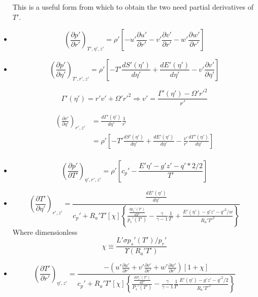 \documentclass[preprint, prX]{revtex4}
\newcommand{\gogmo}{\frac{\gamma}{\gamma-1}}
\newcommand{\dd}[2]{\frac{d#1}{d#2}}
\newcommand{\pd}[2]{\frac{\partial#1}{\partial#2}}
\newcommand{\tpd}[3]{\left( \frac{\partial#1}{\partial#2} \right)_{#3}}
\begin{document}
\begin{itemize}
This is a useful form from which to obtain the two need partial derivatives of $T'$.

\item 
\begin{equation}
\tpd{p'}{r'}{T', \eta', z'} = \rho' \left[ -u' \pd{u'}{r'} - v'\pd{v'}{r'} - w'\pd{w'}{r'} \right]
\end{equation}

\item
\begin{equation}
\tpd{p'}{\eta'}{T', r', z'} = \rho' \left[ -T' \dd{S'(\eta')}{\eta'} + \dd{E'(\eta')}{\eta'} - v' \pd{v'}{\eta'} \right]
\end{equation}

\begin{equation}
\Gamma'(\eta') = r'v' + \Omega'r'^2 \Rightarrow v' = \frac{\Gamma'(\eta') - \Omega'r'^2}{r'}
\end{equation}

\begin{equation}
\begin{split}
\tpd{v'}{\eta'}{r',z'} &= \dd{\Gamma'(\eta')}{\eta'}\frac{1}{r'} \\
& = \rho' \left[ -T' \dd{S'(\eta')}{\eta'} + \dd{E'(\eta')}{\eta'} - \frac{v'}{r'} \dd{\Gamma'(\eta')}{\eta'} \right] \\
\end{split}
\end{equation}

\item
\begin{equation}
\tpd{p'}{T'}{\eta', r', z'} = \rho' \left[ c_p'- \frac{E'{\eta'} -g'z' - q'*2/2}{T'} \right]
\end{equation}

\item
\begin{equation}
\tpd{T'}{\eta'}{r',z'} = \frac{\dd{E'(\eta')}{\eta'	}}{c_p' + R_a'T'[\chi]\left\{ \frac{\dd{p_s'(T')}{T'}}{p_s'(T')} - \gogmo \frac{1}{T'} + \frac{E'(\eta') - g'z'-q'^2/w}{R_a'T'^2}\right\} }
\end{equation}
Where dimensionless 
\begin{equation}
\chi \equiv \frac{L'\sigma p_s'(T')/p_r'}{\Upsilon(R_a' T')} 
\end{equation}

\item
\begin{equation}
\tpd{T'}{r'}{\eta',z'} = \frac{-\left( u'\pd{u'}{r'} + v' \pd{v'}{r'} + w'\pd{w'}{r'}\right)\left[ 1 + \chi\right]}{c_p' + R_a'T'[\chi] \left\{ \frac{\dd{P_s'(T')}{T'}}{P_s'(T')} - \gogmo \frac{1}{T'} \frac{E'(\eta') - g'z'-q'^2/2}{R_a'T'^2}  \right\}}
\end{equation}


\end{itemize}
\end{document}
